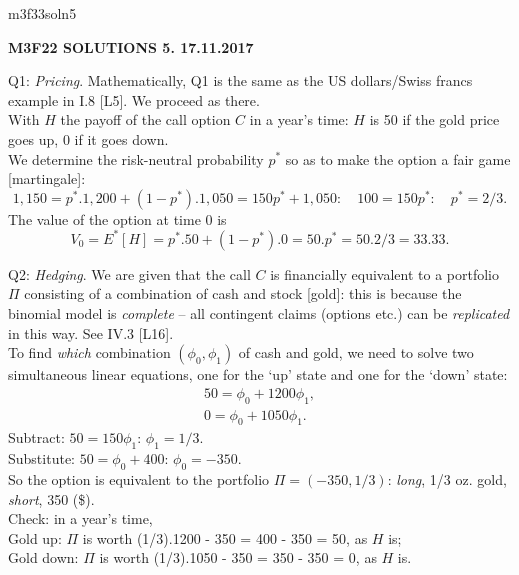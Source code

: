 \documentclass[12pt]{article}
\begin{document}
\def\R{\mathbb{R}}
\def\C{\mathbb{C}}
\def\Z{\mathbb{Z}}
\def\N{\mathbb{N}}
\def\Q{\mathbb{Q}}
\def\D{\mathbb{D}}
\def\Sp{{\mathbb{S}}}
\def\T{\mathbb{T}}
\def\H{\mathbb{H}}
\def\hb{\hfil \break}
\def\ni{\noindent}
\def\i{\indent}
\def\a{\alpha}
\def\b{\beta}
\def\e{\epsilon}
\def\d{\delta}
\def\D{\Delta}
\def\G{\Gamma}
\def\g{\gamma}
\def\l{\lambda}
\def\m{\mu}
\def\s{\sigma}
\def\Si{\Sigma}
\def\th{\theta}
\def\z{\zeta}
\def\p{\phi}
\def\o{\omega}
\def\O{\Omega}
\def\t{\tau}
\def\L{\it \char'44}
\def\F{\mathcal{F}}
\def\B{\mathcal{B}}
\def\C{\mathcal{C}}
\def\half{\frac{1}{2}}
\ni m3f33soln5 \\
\begin{center}
{\bf M3F22 SOLUTIONS 5.  17.11.2017} 
\end{center}
\ni Q1: {\it Pricing}.  Mathematically, Q1 is the same as the US dollars/Swiss francs example in I.8 [L5].  We proceed as there. \\
\i With $H$ the payoff of the call option $C$ in a year's time:  $H$ is 50 if the gold price goes up, 0 if it goes down. \\
\i We determine the risk-neutral probability $p^{\ast}$ so as to make the option a fair game [martingale]:
$$
1,150 = p^{\ast}.1,200 + (1 - p^{\ast}).1,050 = 150 p^{\ast} + 1,050: \quad 100 = 150 p^{\ast}: \quad p^{\ast} = 2/3.
$$
The value of the option at time 0 is
$$
V_0 = E^{\ast} [H] = p^{\ast}.50 + (1 - p^{\ast}).0 = 50.p^{\ast} = 50.2/3 = 33.33.
$$

\ni Q2: {\it Hedging}.  We are given that the call $C$ is financially equivalent to a portfolio $\Pi$ consisting of a combination of cash and stock [gold]: this is because the binomial model is {\it complete} -- all contingent claims (options etc.) can be {\it replicated} in this way.  See IV.3 [L16]. \\
\i To find {\it which} combination $({\phi}_0, {\phi}_1)$ of cash and gold, we need to solve two simultaneous linear equations, one for the `up' state and one for the `down' state:
\begin{eqnarray*}
50 = {\phi}_0 + 1200 {\phi}_1, \\
0 = {\phi}_0 + 1050 {\phi}_1.
\end{eqnarray*}
Subtract: $50 = 150 {\phi}_1$: ${\phi}_1 = 1/3$. \\
Substitute: $50 = {\phi}_0 + 400$: ${\phi}_0 = -350$. \\
So the option is equivalent to the portfolio $\Pi = (-350, 1/3)$: {\it long}, 1/3 oz. gold, {\it short}, 350 (\$).\\
Check: in a year's time, \\
Gold up: $\Pi$ is worth (1/3).1200 - 350 = 400 - 350 = 50, as $H$ is; \\
Gold down: $\Pi$ is worth (1/3).1050 - 350 = 350 - 350 = 0, as $H$ is. \\
\end{document}
